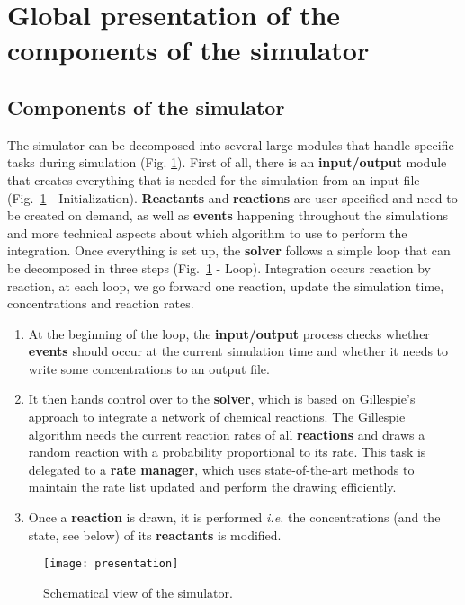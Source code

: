 \graphicspath{{\relativepath/figures/}}

\section{Global presentation of the components of the simulator}
\subsection{Components of the simulator}

The simulator can be decomposed into several large modules that handle specific tasks during simulation (Fig. \ref{presentation}). First of all, there is an \textbf{input/output} module that creates everything that is needed for the simulation from an input file (Fig.~\ref{presentation} - Initialization). \textbf{Reactants} and \textbf{reactions} are user-specified and need to be created on demand, as well as \textbf{events} happening throughout the simulations and more technical aspects about which algorithm to use to perform the integration. Once everything is set up, the \textbf{solver} follows a simple loop that can be decomposed in three steps (Fig.~\ref{presentation} - Loop). Integration occurs reaction by reaction, at each loop, we go forward one reaction, update the simulation time, concentrations and reaction rates.

\begin{enumerate}
	\item At the beginning of the loop, the \textbf{input/output} process checks whether \textbf{events} should occur at the current simulation time and whether it needs to write some concentrations to an output file.
	\item It then hands control over to the \textbf{solver}, which is based on Gillespie's approach to integrate a network of chemical reactions. The Gillespie algorithm needs the current reaction rates of all \textbf{reactions} and draws a random reaction with a probability proportional to its rate. This task is delegated to a \textbf{rate manager}, which uses state-of-the-art methods to maintain the rate list updated and perform the drawing efficiently.
	\item Once a \textbf{reaction} is drawn, it is performed \textit{i.e.} the concentrations (and the state, see below) of its \textbf{reactants} is modified.
\end{enumerate}

\begin{figure}[!ht]
        \centering
        \texttt{[image: presentation]}
	\caption{Schematical view of the simulator.}
	\label{presentation}
\end{figure}









